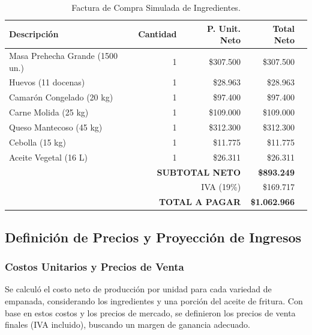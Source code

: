 \documentclass[12pt]{article}
\begin{document}
\begin{table}[H]
            \begin{tabular}{|l|r|r|r|r|}
                \hline
                \textbf{Descripción} & \textbf{Cantidad} & \textbf{P. Unit. Neto} & \textbf{Total Neto} \\
                \hline
                Masa Prehecha Grande (1500 un.) & 1 & \$307.500 & \$307.500 \\
                Huevos (11 docenas) & 1 & \$28.963 & \$28.963 \\
                Camarón Congelado (20 kg) & 1 & \$97.400 & \$97.400 \\
                Carne Molida (25 kg) & 1 & \$109.000 & \$109.000 \\
                Queso Mantecoso (45 kg) & 1 & \$312.300 & \$312.300 \\
                Cebolla (15 kg) & 1 & \$11.775 & \$11.775 \\
                Aceite Vegetal (16 L) & 1 & \$26.311 & \$26.311 \\
                \hline
                \multicolumn{3}{|r|}{\textbf{SUBTOTAL NETO}} & \textbf{\$893.249} \\
                \multicolumn{3}{|r|}{IVA (19\%)} & \$169.717 \\
                \multicolumn{3}{|r|}{\textbf{TOTAL A PAGAR}} & \textbf{\$1.062.966} \\
                \hline
            \end{tabular}
            \caption{Factura de Compra Simulada de Ingredientes.}
            \label{tab:factura_compra}
        \end{table}
    \newpage
    \subsection{Definición de Precios y Proyección de Ingresos}
        \subsubsection{Costos Unitarios y Precios de Venta}
        Se calculó el costo neto de producción por unidad para cada variedad de empanada, considerando los ingredientes y una porción del aceite de fritura. Con base en estos costos y los precios de mercado, se definieron los precios de venta finales (IVA incluido), buscando un margen de ganancia adecuado.
\end{document}
